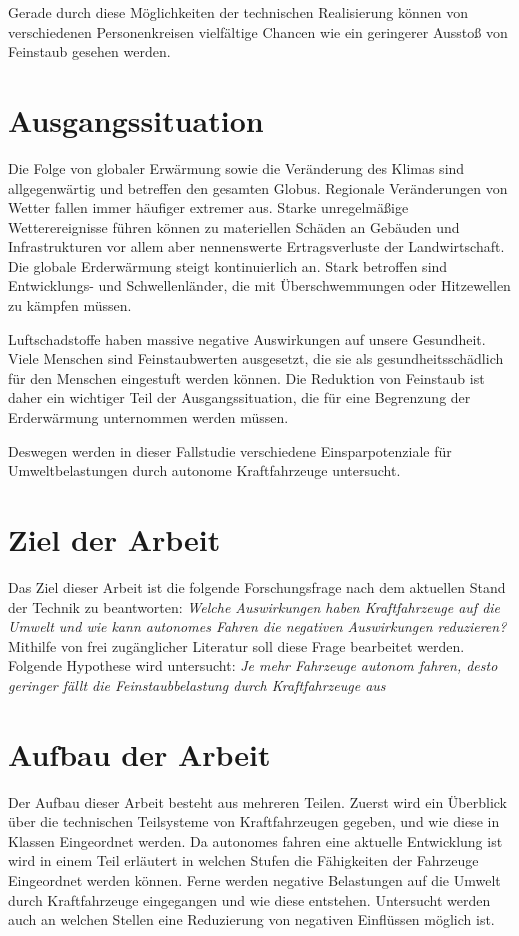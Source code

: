 Gerade durch diese Möglichkeiten der technischen Realisierung können von verschiedenen Personenkreisen
vielfältige Chancen wie ein geringerer Ausstoß von Feinstaub gesehen werden.

\section{Ausgangssituation}
Die Folge von globaler Erwärmung sowie die Veränderung des Klimas sind allgegenwärtig und betreffen den gesamten Globus.
Regionale Veränderungen von Wetter fallen immer häufiger extremer aus.
Starke unregelmäßige Wetterereignisse führen können zu materiellen Schäden an Gebäuden und Infrastrukturen vor allem aber nennenswerte Ertragsverluste der Landwirtschaft.
Die globale Erderwärmung steigt kontinuierlich an.
Stark betroffen sind Entwicklungs- und Schwellenländer, die mit Überschwemmungen oder Hitzewellen zu kämpfen müssen.


Luftschadstoffe haben massive negative Auswirkungen auf unsere Gesundheit.
Viele Menschen sind Feinstaubwerten ausgesetzt, die sie als gesundheitsschädlich für den Menschen eingestuft werden können.
Die Reduktion von Feinstaub ist daher ein wichtiger Teil der Ausgangssituation, die für eine Begrenzung der Erderwärmung unternommen werden müssen.

Deswegen werden in dieser Fallstudie verschiedene Einsparpotenziale für Umweltbelastungen durch autonome Kraftfahrzeuge untersucht.


\section{Ziel der Arbeit}
Das Ziel dieser Arbeit ist die folgende Forschungsfrage nach dem aktuellen Stand der Technik zu beantworten:
\textit{Welche Auswirkungen haben Kraftfahrzeuge auf die Umwelt und wie kann autonomes Fahren die negativen Auswirkungen reduzieren?}
Mithilfe von frei zugänglicher Literatur soll diese Frage bearbeitet werden.
Folgende Hypothese wird untersucht:
\textit{Je mehr Fahrzeuge autonom fahren, desto geringer fällt die Feinstaubbelastung durch Kraftfahrzeuge aus}

\section{Aufbau der Arbeit}
Der Aufbau dieser Arbeit besteht aus mehreren Teilen.
Zuerst wird ein Überblick über die technischen Teilsysteme von Kraftfahrzeugen gegeben, und wie diese
in Klassen Eingeordnet werden.
Da autonomes fahren eine aktuelle Entwicklung ist wird in einem Teil erläutert in welchen Stufen die Fähigkeiten der Fahrzeuge Eingeordnet werden können.
Ferne werden negative Belastungen auf die Umwelt durch Kraftfahrzeuge eingegangen und wie diese entstehen.
Untersucht werden auch an welchen Stellen eine Reduzierung von negativen Einflüssen möglich ist.

